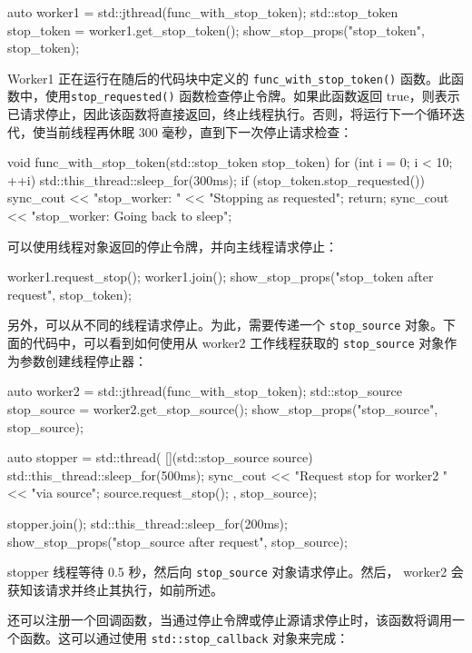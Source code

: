 \begin{cpp}
auto worker1 = std::jthread(func_with_stop_token);
std::stop_token stop_token = worker1.get_stop_token();
show_stop_props("stop_token", stop_token);
\end{cpp}

Worker1 正在运行在随后的代码块中定义的 \verb|func_with_stop_token()| 函数。此函数中，使用\verb|stop_requested()| 函数检查停止令牌。如果此函数返回 true，则表示已请求停止，因此该函数将直接返回，终止线程执行。否则，将运行下一个循环迭代，使当前线程再休眠 300 毫秒，直到下一次停止请求检查：

\begin{cpp}
void func_with_stop_token(std::stop_token stop_token) {
    for (int i = 0; i < 10; ++i) {
        std::this_thread::sleep_for(300ms);
        if (stop_token.stop_requested()) {
            sync_cout << "stop_worker: "
            << "Stopping as requested\n";
            return;
        }
        sync_cout << "stop_worker: Going back to sleep\n";
    }
}
\end{cpp}

可以使用线程对象返回的停止令牌，并向主线程请求停止：

\begin{cpp}
worker1.request_stop();
worker1.join();
show_stop_props("stop_token after request", stop_token);
\end{cpp}

另外，可以从不同的线程请求停止。为此，需要传递一个 \verb|stop_source| 对象。下面的代码中，可以看到如何使用从 worker2 工作线程获取的 \verb|stop_source| 对象作为参数创建线程停止器：

\begin{cpp}
auto worker2 = std::jthread(func_with_stop_token);
std::stop_source stop_source = worker2.get_stop_source();
show_stop_props("stop_source", stop_source);

auto stopper = std::thread( [](std::stop_source source) {
        std::this_thread::sleep_for(500ms);
        sync_cout << "Request stop for worker2 "
                  << "via source\n";
        source.request_stop();
    }, stop_source);

stopper.join();
std::this_thread::sleep_for(200ms);
show_stop_props("stop_source after request", stop_source);
\end{cpp}

stopper 线程等待 0.5 秒，然后向 \verb|stop_source| 对象请求停止。然后， worker2 会获知该请求并终止其执行，如前所述。

还可以注册一个回调函数，当通过停止令牌或停止源请求停止时，该函数将调用一个函数。这可以通过使用 \verb|std::stop_callback| 对象来完成：

